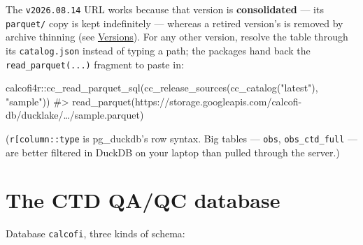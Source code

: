 \documentclass[
  letterpaper,
  DIV=11,
  numbers=noendperiod]{scrreprt}
\newenvironment{Shaded}{\begin{snugshade}}{\end{snugshade}}
\newcommand{\CommentTok}[1]{\textcolor[rgb]{0.37,0.37,0.37}{#1}}
\newcommand{\FunctionTok}[1]{\textcolor[rgb]{0.28,0.35,0.67}{#1}}
\newcommand{\NormalTok}[1]{\textcolor[rgb]{0.00,0.23,0.31}{#1}}
\newcommand{\SpecialCharTok}[1]{\textcolor[rgb]{0.37,0.37,0.37}{#1}}
\newcommand{\StringTok}[1]{\textcolor[rgb]{0.13,0.47,0.30}{#1}}
\begin{document}
The \texttt{v2026.08.14} URL works because that version is
\textbf{consolidated} --- its \texttt{parquet/} copy is kept
indefinitely --- whereas a retired version's is removed by archive
thinning (see \hyperref[sec-versions]{Versions}). For any other version,
resolve the table through its \texttt{catalog.json} instead of typing a
path; the packages hand back the \texttt{read\_parquet(...)} fragment to
paste in:

\begin{Shaded}
\begin{Highlighting}[]
\NormalTok{calcofi4r}\SpecialCharTok{::}\FunctionTok{cc\_read\_parquet\_sql}\NormalTok{(}\FunctionTok{cc\_release\_sources}\NormalTok{(}\FunctionTok{cc\_catalog}\NormalTok{(}\StringTok{"latest"}\NormalTok{), }\StringTok{"sample"}\NormalTok{))}
\CommentTok{\#\textgreater{} read\_parquet(\textquotesingle{}https://storage.googleapis.com/calcofi{-}db/ducklake/…/sample.parquet\textquotesingle{})}
\end{Highlighting}
\end{Shaded}

(\texttt{r{[}\textquotesingle{}column\textquotesingle{}{]}::type} is
pg\_duckdb's row syntax. Big tables --- \texttt{obs},
\texttt{obs\_ctd\_full} --- are better filtered in DuckDB on your laptop
than pulled through the server.)

\section{The CTD QA/QC database}\label{sec-ctd-db}

Database \texttt{calcofi}, three kinds of schema:
\end{document}
